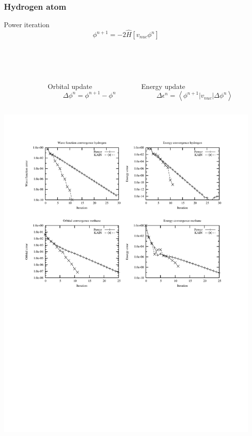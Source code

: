 \documentclass[mathserif, 10pt]{beamer}
\begin{document}
\begin{frame}
    \frametitle{Hydrogen atom}
    \centering
    Power iteration
    \begin{equation}
	\nonumber
	\phi^{n+1} = -2\hat{H}\left[v_{nuc}\phi^n\right]
    \end{equation}
    \ \\
    \ \\
    \ \\
    \begin{columns}
    \begin{column}{.10\textwidth}
    \ \\
    \end{column}
    \begin{column}{.40\textwidth}
    \centering
    Orbital update
    \begin{equation}
	\nonumber
	\Delta\phi^n = \phi^{n+1} - \phi^n
    \end{equation}
    \end{column}
    \begin{column}{.50\textwidth}
    \centering
    Energy update
    \begin{equation}
	\nonumber
	\Delta \epsilon^n = \left<\phi^{n+1}|v_{nuc}|\Delta\phi^n\right>
    \end{equation}
    \end{column}
    \end{columns}    
    \begin{center}
	\includegraphics[scale=0.6, clip, viewport = 50 550 540 730]{figures/convergence.pdf}
    \end{center}
\end{frame}
\end{document}
